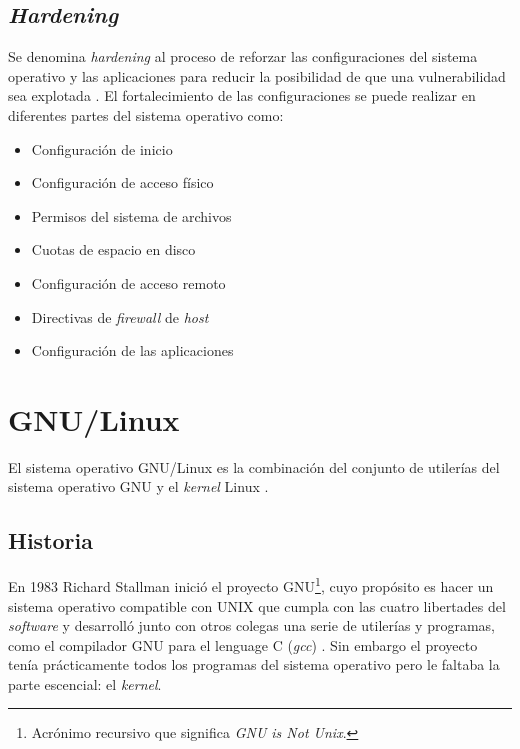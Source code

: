   \subsection {\textit{Hardening}}

Se denomina \textit{hardening} al proceso de reforzar las configuraciones del sistema operativo y las aplicaciones para reducir la posibilidad de que una vulnerabilidad sea explotada \cite{padilla_buenas_2009}. El fortalecimiento de las configuraciones se puede realizar en diferentes partes del sistema operativo como:

\begin{itemize}
  \item Configuraci\'{o}n de inicio
  \item Configuraci\'{o}n de acceso f\'{i}sico
  \item Permisos del sistema de archivos
  \item Cuotas de espacio en disco
  \item Configuraci\'{o}n de acceso remoto
  \item Directivas de \emph{\gls{firewall}} de \emph{\gls{host}}
  \item Configuraci\'{o}n de las aplicaciones
\end{itemize}

\newpage
\section {\textsc{GNU}/Linux}

El sistema operativo GNU/Linux es la combinaci\'{o}n del conjunto de utiler\'{i}as del sistema operativo GNU y el \textsl{\gls{kernel}} Linux \cite{_linux_????}.


  \subsection {Historia}

En 1983 Richard Stallman inici\'{o} el proyecto \textsc{\gls{GNU}}\footnote{Acr\'{o}nimo recursivo que significa \emph{GNU is Not Unix}.}, cuyo prop\'{o}sito es hacer un sistema operativo compatible con \textsc{UNIX} que cumpla con las cuatro libertades del \emph{\gls{software}} y desarroll\'{o} junto con otros colegas una serie de utiler\'{i}as y programas, como el compilador \textsc{\gls{GNU}} para el lenguage \textsc{C} (\textit{gcc}) \cite{_about_????}. Sin embargo el proyecto ten\'{i}a pr\'{a}cticamente todos los programas del sistema operativo pero le faltaba la parte escencial: el \textsl{\gls{kernel}}.


